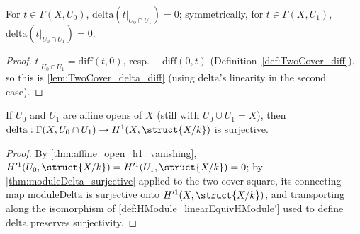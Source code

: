 \begin{lemma}
  \label{lem:TwoCover_delta_resHom}
  \leanok
  For \(t \in \Gamma(X,U_0)\), \(\mathrm{delta}(t|_{U_0 \cap U_1}) = 0\); symmetrically, for
  \(t \in \Gamma(X,U_1)\), \(\mathrm{delta}(t|_{U_0 \cap U_1}) = 0\).
\end{lemma}
\begin{proof}
  \leanok
  \(t|_{U_0 \cap U_1} = \mathrm{diff}(t,0)\), resp.\ \(-\mathrm{diff}(0,t)\)
  (Definition~\ref{def:TwoCover_diff}), so this is \ref{lem:TwoCover_delta_diff} (using
  \(\mathrm{delta}\)'s linearity in the second case).
\end{proof}

\begin{theorem}
  \label{thm:TwoCover_delta_surjective}
  \leanok
  If \(U_0\) and \(U_1\) are affine opens of \(X\) (still with \(U_0 \cup U_1 = X\)), then
  \(\mathrm{delta} : \Gamma(X, U_0 \cap U_1) \to H^1(X,\struct{X/k})\) is surjective.
\end{theorem}
\begin{proof}
  \leanok
  By \ref{thm:affine_open_h1_vanishing}, \(H'^1(U_0,\struct{X/k}) = H'^1(U_1,\struct{X/k}) = 0\);
  by \ref{thm:moduleDelta_surjective} applied to the two-cover square, its connecting map
  \(\mathrm{moduleDelta}\) is surjective onto \(H'^1(X,\struct{X/k})\), and transporting
  along the isomorphism of \ref{def:HModule_linearEquivHModule'} used to define
  \(\mathrm{delta}\) preserves surjectivity.
\end{proof}

